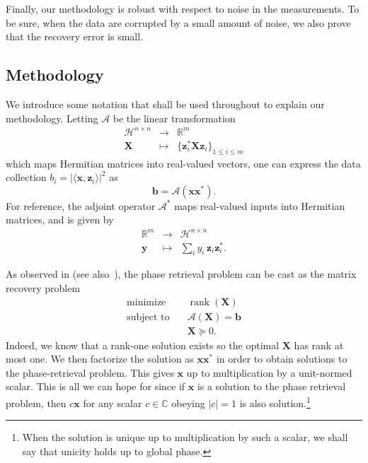 \documentclass[11pt]{article}
\newcommand{\R}{\mathbb{R}}
\newcommand{\C}{\mathbb{C}}
\newcommand{\<}{\langle}
\renewcommand{\>}{\rangle}
\newcommand{\goto}{\rightarrow}
\newcommand{\bx}{\bm{x}}
\newcommand{\bX}{\bm{X}}
\newcommand{\bb}{\bm{b}}
\newcommand{\by}{\bm{y}}
\newcommand{\bz}{\bm{z}}
\newcommand{\rank}{\operatorname{rank}}
\numberwithin{equation}{section}
\newcommand{\cA}{\mathcal{A}}
\begin{document}
Finally, our methodology is robust with respect to noise in the
measurements. To be sure, when the data are corrupted by a small
amount of noise, we also prove that the recovery error is small.

\subsection{Methodology} 
\label{sec:method}

We introduce some notation that shall be used throughout to explain
our methodology. Letting $\cA$ be the linear transformation
\begin{equation}
\label{linmap}
\begin{array}{lll}
  \mathcal{H}^{n \times n} & \goto & \R^m\\
  \bX & \mapsto & \{\bz_i^* \bX \bz_i\}_{1 \le i \le m}
\end{array}
\end{equation}
which maps Hermitian matrices into real-valued vectors, one can
express the data collection $b_i = |\<\bx, \bz_i\>|^2$ as
\begin{equation}
\label{matrixmeasurements}
\bb = \mathcal{A}(\bx \bx^*). 
\end{equation}
For reference, the adjoint operator $\cA^*$ maps real-valued inputs
into Hermitian matrices, and is given by
\[
\begin{array}{lll}
  \R^{m} & \goto & \mathcal{H}^{n \times n}\\
  \by & \mapsto & \sum_i y_i \, \bz_i \bz_i^*. 
\end{array}
\]

As observed in \cite{CMP10,CESV} (see also~\cite{LV11}),
the phase retrieval problem can be cast as the matrix recovery problem
\begin{equation}
\label{eq:rankmin}
  \begin{array}{ll}
    \text{minimize}   & \quad \rank(\bX)\\
    \text{subject to} & \quad  \cA(\bX) = \bb\\
& \quad \bX \succeq 0.
\end{array}
\end{equation}
Indeed, we know that a rank-one solution exists so the optimal $\bX$ has
rank at most one. We then factorize the solution as $\bx \bx^*$ in order
to obtain solutions to the phase-retrieval problem. This gives $\bx$ up
to multiplication by a unit-normed scalar. This is all we can hope for
since if $\bx$ is a solution to the phase retrieval problem, then $c \bx$
for any scalar $c \in \C$ obeying $|c| = 1$ is also
solution.\footnote{When the solution is unique up to multiplication by
  such a scalar, we shall say that unicity holds up to global phase.}
\end{document}
